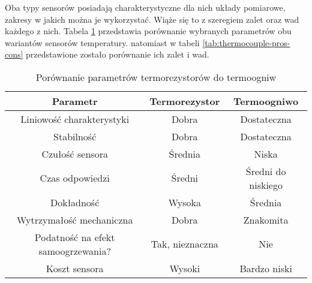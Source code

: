 Oba typy sensorów posiadają charakterystyczne dla nich układy pomiarowe, zakresy w jakich można je
wykorzystać. Wiąże się to z szeregiem zalet oraz wad każdego z nich. Tabela
\ref{tab:rtd-vs-thermocouple} przedstawia porównanie wybranych parametrów obu wariantów sensorów
temperatury. natomiast w tabeli \ref{tab:thermocouple-pros-cons} przedstawione zostało porównanie
ich zalet i wad.
\begin{table}[!htbp]
  \centering
  \caption{\label{tab:rtd-vs-thermocouple}Porównanie parametrów termorezystorów do termoogniw}
  \begin{tabular}{ccc}
    \toprule
    Parametr                           & Termorezystor   & Termoogniwo        \\
    \midrule
    Liniowość charakterystyki          & Dobra           & Dostateczna        \\
    Stabilność                         & Dobra           & Dostateczna        \\
    Czułość sensora                    & Średnia         & Niska              \\
    Czas odpowiedzi                    & Średni          & Średni do niskiego \\
    Dokładność                         & Wysoka          & Średnia            \\
    Wytrzymałość mechaniczna           & Dobra           & Znakomita          \\
    Podatność na efekt samoogrzewania? & Tak, nieznaczna & Nie                \\
    Koszt sensora                      & Wysoki          & Bardzo niski       \\
    \bottomrule
  \end{tabular}
\end{table}

